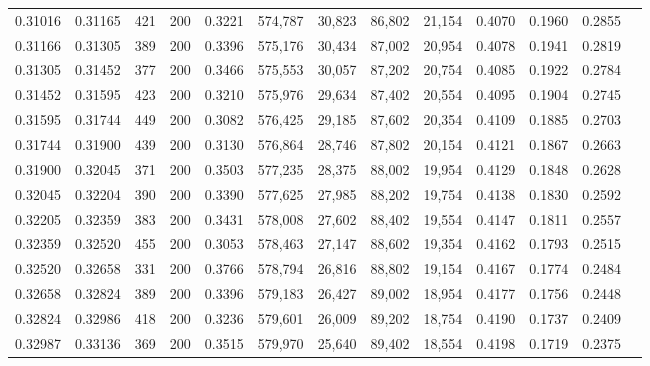 \begin{tabular}{rrrrrrrrrrrrr}
0.31016 & 0.31165 &   421 & 200 &                                     0.3221 & 574,787 &  30,823 &  86,802 &  21,154 & 0.4070 & 0.1960 & 0.2855 \\
0.31166 & 0.31305 &   389 & 200 &                                     0.3396 & 575,176 &  30,434 &  87,002 &  20,954 & 0.4078 & 0.1941 & 0.2819 \\
0.31305 & 0.31452 &   377 & 200 &                                     0.3466 & 575,553 &  30,057 &  87,202 &  20,754 & 0.4085 & 0.1922 & 0.2784 \\
0.31452 & 0.31595 &   423 & 200 &                                     0.3210 & 575,976 &  29,634 &  87,402 &  20,554 & 0.4095 & 0.1904 & 0.2745 \\
0.31595 & 0.31744 &   449 & 200 &                                     0.3082 & 576,425 &  29,185 &  87,602 &  20,354 & 0.4109 & 0.1885 & 0.2703 \\
0.31744 & 0.31900 &   439 & 200 &                                     0.3130 & 576,864 &  28,746 &  87,802 &  20,154 & 0.4121 & 0.1867 & 0.2663 \\
0.31900 & 0.32045 &   371 & 200 &                                     0.3503 & 577,235 &  28,375 &  88,002 &  19,954 & 0.4129 & 0.1848 & 0.2628 \\
0.32045 & 0.32204 &   390 & 200 &                                     0.3390 & 577,625 &  27,985 &  88,202 &  19,754 & 0.4138 & 0.1830 & 0.2592 \\
0.32205 & 0.32359 &   383 & 200 &                                     0.3431 & 578,008 &  27,602 &  88,402 &  19,554 & 0.4147 & 0.1811 & 0.2557 \\
0.32359 & 0.32520 &   455 & 200 &                                     0.3053 & 578,463 &  27,147 &  88,602 &  19,354 & 0.4162 & 0.1793 & 0.2515 \\
0.32520 & 0.32658 &   331 & 200 &                                     0.3766 & 578,794 &  26,816 &  88,802 &  19,154 & 0.4167 & 0.1774 & 0.2484 \\
0.32658 & 0.32824 &   389 & 200 &                                     0.3396 & 579,183 &  26,427 &  89,002 &  18,954 & 0.4177 & 0.1756 & 0.2448 \\
0.32824 & 0.32986 &   418 & 200 &                                     0.3236 & 579,601 &  26,009 &  89,202 &  18,754 & 0.4190 & 0.1737 & 0.2409 \\
0.32987 & 0.33136 &   369 & 200 &                                     0.3515 & 579,970 &  25,640 &  89,402 &  18,554 & 0.4198 & 0.1719 & 0.2375 \\

\end{tabular}
